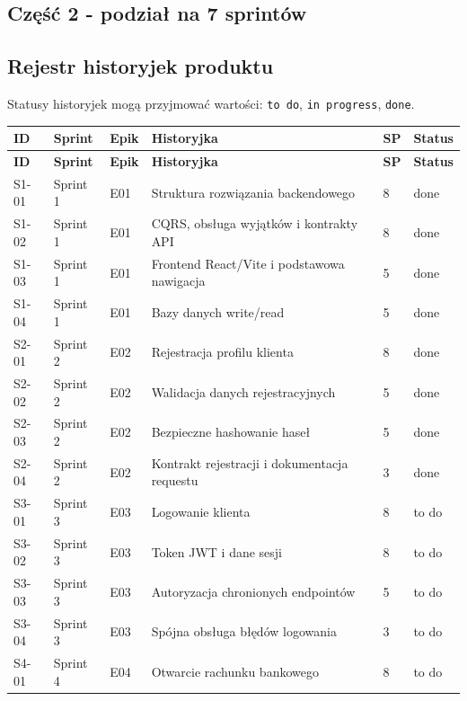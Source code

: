\documentclass[12pt,a4paper]{article}
\begin{document}
\subsection*{Część 2 - podział na 7 sprintów}

\subsection*{Rejestr historyjek produktu}

Statusy historyjek mogą przyjmować wartości: \texttt{to do}, \texttt{in progress}, \texttt{done}.

\begingroup
\footnotesize
{}
\begin{longtable}{@{}L{0.08\textwidth}L{0.12\textwidth}L{0.10\textwidth}L{0.42\textwidth}C{0.06\textwidth}L{0.12\textwidth}@{}}
\toprule
{}
\textbf{ID} & \textbf{Sprint} & \textbf{Epik} & \textbf{Historyjka} & \textbf{SP} & \textbf{Status} \\
\midrule
\endfirsthead
\toprule
{}
\textbf{ID} & \textbf{Sprint} & \textbf{Epik} & \textbf{Historyjka} & \textbf{SP} & \textbf{Status} \\
\midrule
\endhead
S1-01 & Sprint 1 & E01 & Struktura rozwiązania backendowego & 8 & done \\
S1-02 & Sprint 1 & E01 & CQRS, obsługa wyjątków i kontrakty API & 8 & done \\
S1-03 & Sprint 1 & E01 & Frontend React/Vite i podstawowa nawigacja & 5 & done \\
S1-04 & Sprint 1 & E01 & Bazy danych write/read & 5 & done \\
S2-01 & Sprint 2 & E02 & Rejestracja profilu klienta & 8 & done \\
S2-02 & Sprint 2 & E02 & Walidacja danych rejestracyjnych & 5 & done \\
S2-03 & Sprint 2 & E02 & Bezpieczne hashowanie haseł & 5 & done \\
S2-04 & Sprint 2 & E02 & Kontrakt rejestracji i dokumentacja requestu & 3 & done \\
S3-01 & Sprint 3 & E03 & Logowanie klienta & 8 & to do \\
S3-02 & Sprint 3 & E03 & Token JWT i dane sesji & 8 & to do \\
S3-03 & Sprint 3 & E03 & Autoryzacja chronionych endpointów & 5 & to do \\
S3-04 & Sprint 3 & E03 & Spójna obsługa błędów logowania & 3 & to do \\
S4-01 & Sprint 4 & E04 & Otwarcie rachunku bankowego & 8 & to do \\

\end{longtable}
\end{document}
